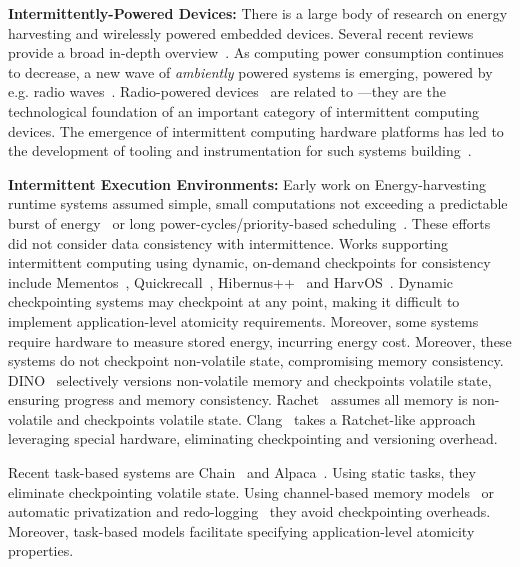 {\noindent \textbf{Intermittently-Powered Devices:}} There is a large body of research on energy harvesting and wirelessly powered embedded devices. Several recent reviews provide a broad in-depth overview~\cite{prasad_comst_2014,sample_procieee_2013,huang:commag:2015,visser_procieee_2013,kamalinejad_commag_2015,ku_cst_2016}. As computing power consumption continues to decrease, a new wave of {\em ambiently} powered systems is emerging, powered by e.g. radio waves~\cite{patel_pervasive_2017,rf_powered_computing_gollakota_2014}.
Radio-powered devices~\cite{wisp5,moo,zhao_rfid_2015,holleman_biocas_2008,thomas_jbcs_2012,naderiparizi_rfid_2015,rodriguez_tbcs_2015,liu_sigcomm_2013,kicksat,nadeau_naturebio_2017}
are related to \sys---they are the technological foundation of an
important category of intermittent computing devices. The emergence of
intermittent computing hardware platforms has led to the development of tooling
and instrumentation for such systems
building~\cite{hester_sensys_2014,hester_sensys_2015,edb,stork,wisent}.

{\noindent \textbf{Intermittent Execution Environments:}} Early work on Energy-harvesting runtime systems assumed simple, small computations not exceeding a predictable burst of energy~\cite{dewdrop} or long power-cycles/priority-based scheduling~\cite{sorber_sensys_2007}. These efforts did not consider data consistency with intermittence. Works supporting intermittent computing using dynamic, on-demand checkpoints for consistency include Mementos~\cite{mementos}, Quickrecall~\cite{quickrecall}, Hibernus++~\cite{hibernusplusplus} and HarvOS~\cite{mottola2017harvos}. Dynamic checkpointing systems may checkpoint
at any point, making it difficult to implement application-level atomicity
requirements. Moreover, some systems require hardware to measure stored energy, incurring energy cost. Moreover, these systems do not checkpoint non-volatile state, compromising memory consistency. DINO~\cite{dino} selectively versions non-volatile memory and checkpoints volatile state, ensuring progress and memory consistency. Rachet~\cite{ratchet} assumes all memory is non-volatile and checkpoints volatile state. Clang~\cite{hicks_isca_2017} takes a Ratchet-like approach leveraging special hardware, eliminating checkpointing and versioning overhead. 

Recent task-based systems are Chain~\cite{chain} and
Alpaca~\cite{alpaca}. Using static tasks, they eliminate checkpointing volatile state. Using channel-based memory models~\cite{chain} or automatic privatization and redo-logging~\cite{alpaca} they avoid checkpointing overheads. Moreover, task-based models facilitate specifying application-level atomicity properties.

